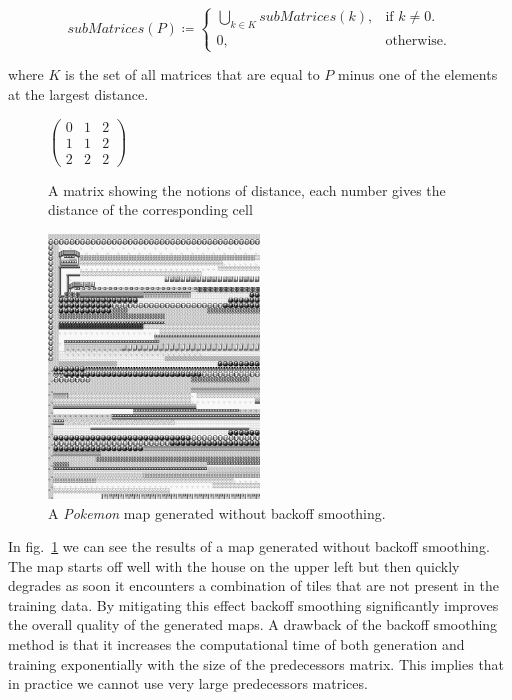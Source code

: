 \documentclass[A4paper,]{article}
\begin{document}
\begin{equation}
subMatrices(P) \coloneqq\begin{cases}
\bigcup_{k \in K} subMatrices(k), & \text{if $k \neq 0$}.\\
0, & \text{otherwise}.
\end{cases}
\end{equation}

where \(K\) is the set of all matrices that are equal to \(P\) minus one
of the elements at the largest distance.

\begin{figure}[h]
\centering
$
\begin{pmatrix}
 0& 1& 2\\ 
 1& 1& 2\\ 
 2& 2& 2 
\end{pmatrix}
$
\caption{A matrix showing the notions of distance, each number gives the distance of the corresponding cell}
\end{figure}

\begin{figure}
\centering
\includegraphics[width=0.50000\textwidth]{../data/pokemon-red/generated/250n-3k-without-backoff/image/12.png}
\caption{A \emph{Pokemon} map generated without backoff
smoothing.}\label{fig:backoff}
\end{figure}

In fig.~\ref{fig:backoff} we can see the results of a map generated
without backoff smoothing. The map starts off well with the house on the
upper left but then quickly degrades as soon it encounters a combination
of tiles that are not present in the training data. By mitigating this
effect backoff smoothing significantly improves the overall quality of
the generated maps. A drawback of the backoff smoothing method is that
it increases the computational time of both generation and training
exponentially with the size of the predecessors matrix. This implies
that in practice we cannot use very large predecessors matrices.
\end{document}
